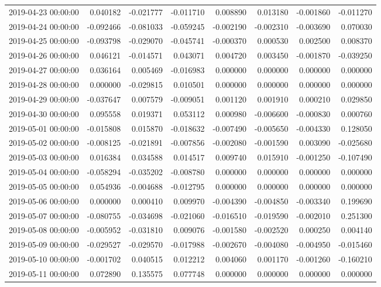 \begin{tabular}{lrrrrrrr}
2019-04-23 00:00:00 & 0.040182 & -0.021777 & -0.011710 & 0.008890 & 0.013180 & -0.001860 & -0.011270 \\
2019-04-24 00:00:00 & -0.092466 & -0.081033 & -0.059245 & -0.002190 & -0.002310 & -0.003690 & 0.070030 \\
2019-04-25 00:00:00 & -0.093798 & -0.029070 & -0.045741 & -0.000370 & 0.000530 & 0.002500 & 0.008370 \\
2019-04-26 00:00:00 & 0.046121 & -0.014571 & 0.043071 & 0.004720 & 0.003450 & -0.001870 & -0.039250 \\
2019-04-27 00:00:00 & 0.036164 & 0.005469 & -0.016983 & 0.000000 & 0.000000 & 0.000000 & 0.000000 \\
2019-04-28 00:00:00 & 0.000000 & -0.029815 & 0.010501 & 0.000000 & 0.000000 & 0.000000 & 0.000000 \\
2019-04-29 00:00:00 & -0.037647 & 0.007579 & -0.009051 & 0.001120 & 0.001910 & 0.000210 & 0.029850 \\
2019-04-30 00:00:00 & 0.095558 & 0.019371 & 0.053112 & 0.000980 & -0.006600 & -0.000830 & 0.000760 \\
2019-05-01 00:00:00 & -0.015808 & 0.015870 & -0.018632 & -0.007490 & -0.005650 & -0.004330 & 0.128050 \\
2019-05-02 00:00:00 & -0.008125 & -0.021891 & -0.007856 & -0.002080 & -0.001590 & 0.003090 & -0.025680 \\
2019-05-03 00:00:00 & 0.016384 & 0.034588 & 0.014517 & 0.009740 & 0.015910 & -0.001250 & -0.107490 \\
2019-05-04 00:00:00 & -0.058294 & -0.035202 & -0.008780 & 0.000000 & 0.000000 & 0.000000 & 0.000000 \\
2019-05-05 00:00:00 & 0.054936 & -0.004688 & -0.012795 & 0.000000 & 0.000000 & 0.000000 & 0.000000 \\
2019-05-06 00:00:00 & 0.000000 & 0.000410 & 0.009970 & -0.004390 & -0.004850 & -0.003340 & 0.199690 \\
2019-05-07 00:00:00 & -0.080755 & -0.034698 & -0.021060 & -0.016510 & -0.019590 & -0.002010 & 0.251300 \\
2019-05-08 00:00:00 & -0.005952 & -0.031810 & 0.009076 & -0.001580 & -0.002520 & 0.000250 & 0.004140 \\
2019-05-09 00:00:00 & -0.029527 & -0.029570 & -0.017988 & -0.002670 & -0.004080 & -0.004950 & -0.015460 \\
2019-05-10 00:00:00 & -0.001702 & 0.040515 & 0.012212 & 0.004060 & 0.001170 & -0.001260 & -0.160210 \\
2019-05-11 00:00:00 & 0.072890 & 0.135575 & 0.077748 & 0.000000 & 0.000000 & 0.000000 & 0.000000 \\

\end{tabular}
